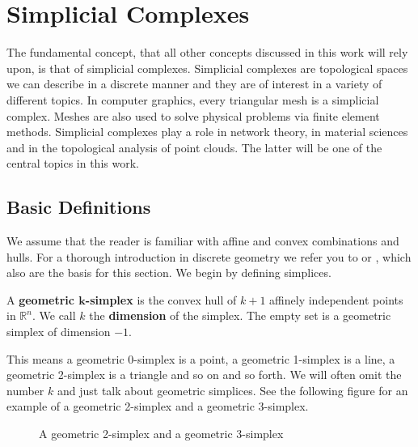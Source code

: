 \chapter{Simplicial Complexes}
The fundamental concept, that all other concepts discussed in this work will rely upon, is that of simplicial complexes. Simplicial complexes are topological spaces we can describe in a discrete manner and they are of interest in a variety of different topics. In computer graphics, every triangular mesh is a simplicial complex. Meshes are also used to solve physical problems via finite element methods. Simplicial complexes play a role in network theory, in material sciences and in the topological analysis of point clouds. The latter will be one of the central topics in this work. 

\section{Basic Definitions} 
\label{sec:SimplicialComplexes}

We assume that the reader is familiar with affine and convex combinations and hulls. For a thorough introduction in discrete geometry we refer you to \cite{Polyhedral+and+Algebraic+Methods} or \cite{Computational+Topology}, which also are the basis for this section. We begin by defining simplices.

\begin{defi}
A \textbf{geometric $\bm{k}$-simplex} is the convex hull of $k+1$ affinely independent points in $\mathbb{R}^n$. We call $k$ the \textbf{dimension} of the simplex. The empty set is a geometric simplex of dimension $-1$.
\end{defi}

This means a geometric 0-simplex is a point, a geometric 1-simplex is a line, a geometric 2-simplex is a triangle and so on and so forth. We will often omit the number $k$ and just talk about geometric simplices. See the following figure for an example of a geometric 2-simplex and a geometric 3-simplex. 

\begin{figure}[H]
\begin{subfigure}[c]{0.49\textwidth}
\begin{center}

\end{center}
\end{subfigure}
\begin{subfigure}[c]{0.49\textwidth}
\begin{center}

\end{center}
\end{subfigure}
\caption{A geometric 2-simplex and a geometric 3-simplex}
\label{fig:simplices}
\end{figure}



